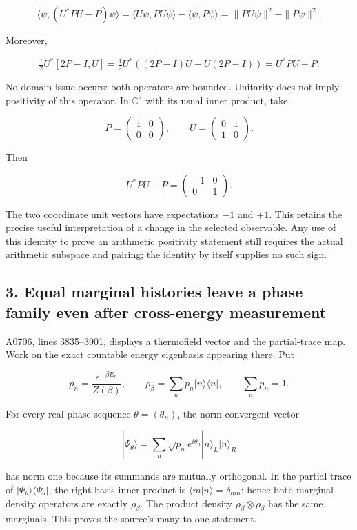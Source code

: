 \documentclass[10pt,a4paper,oneside]{report}
\begin{document}
\[
\langle\psi,(U^*PU-P)\psi\rangle
=\langle U\psi,PU\psi\rangle-\langle\psi,P\psi\rangle
=\|PU\psi\|^2-\|P\psi\|^2.
\]

Moreover,

\[
\tfrac12U^*[2P-I,U]
=\tfrac12U^*((2P-I)U-U(2P-I))
=U^*PU-P.
\]

No domain issue occurs: both operators are bounded. Unitarity does not
imply positivity of this operator. In \(\mathbb C^2\) with its usual
inner product, take

\[
P=\begin{pmatrix}1&0\\0&0\end{pmatrix},
\qquad U=\begin{pmatrix}0&1\\1&0\end{pmatrix}.
\]

Then

\[
U^*PU-P=\begin{pmatrix}-1&0\\0&1\end{pmatrix}.
\]

The two coordinate unit vectors have expectations \(-1\) and \(+1\).
This retains the precise useful interpretation of a change in the
selected observable. Any use of this identity to prove an arithmetic
positivity statement still requires the actual arithmetic subspace and
pairing; the identity by itself supplies no such sign.

\subsection{3. Equal marginal histories leave a phase family even after
cross-energy
measurement}\label{proof10:equal-marginal-histories-leave-a-phase-family-even-after-cross-energy-measurement}

A0706, lines 3835--3901, displays a thermofield vector and the
partial-trace map. Work on the exact countable energy eigenbasis
appearing there. Put

\[
p_n=\frac{e^{-\beta E_n}}{Z(\beta)},\qquad
\rho_\beta=\sum_n p_n|n\rangle\langle n|,
\qquad \sum_n p_n=1.
\]

For every real phase sequence \(\theta=(\theta_n)\), the norm-convergent
vector

\[
|\Psi_\theta\rangle=\sum_n\sqrt{p_n}e^{i\theta_n}|n\rangle_L|n\rangle_R
\]

has norm one because its summands are mutually orthogonal. In the
partial trace of \(|\Psi_\theta\rangle\langle\Psi_\theta|\), the right
basis inner product is \(\langle m|n\rangle=\delta_{mn}\); hence both
marginal density operators are exactly \(\rho_\beta\). The product
density \(\rho_\beta\otimes\rho_\beta\) has the same marginals. This
proves the source's many-to-one statement.
\end{document}
